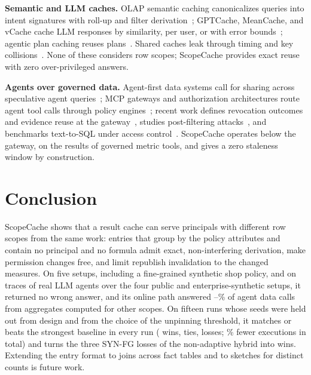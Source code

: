 \documentclass[sigconf, nonacm]{acmart}
\begin{document}
\textbf{Semantic and LLM caches.} OLAP semantic caching canonicalizes queries into intent signatures with roll-up and filter derivation~\cite{bindschaedler26}; GPTCache, MeanCache, and vCache cache LLM responses by similarity, per user, or with error bounds~\cite{gptcache23,meancache24,vcache25}; agentic plan caching reuses plans~\cite{plancache25}. Shared caches leak through timing and key collisions~\cite{gu25,song24,keycoll26}. None of these considers row scopes; ScopeCache provides exact reuse with zero over-privileged answers.

\textbf{Agents over governed data.} Agent-first data systems call for sharing across speculative agent queries~\cite{agentfirst25,wadlom26}; MCP gateways and authorization architectures route agent tool calls through policy engines~\cite{mcpgw26,authzarch26}; recent work defines revocation outcomes and evidence reuse at the gateway~\cite{revocation26,matoi26,notrace26}, studies post-filtering attacks~\cite{plaintext26}, and benchmarks text-to-SQL under access control~\cite{rbact2s26,rolerefusal25}. ScopeCache operates below the gateway, on the results of governed metric tools, and gives a zero staleness window by construction.

\section{Conclusion}
\label{sec:conclusion}

ScopeCache shows that a result cache can serve principals with different row scopes from the same work: entries that group by the policy attributes and contain no principal and no formula admit exact, non-interfering derivation, make permission changes free, and limit republish invalidation to the changed measures. On five setups, including a fine-grained synthetic shop policy, and on traces of real LLM agents over the four public and enterprise-synthetic setups, it returned no wrong answer, and its online path answered \agentXscopeMeanLo--\agentXscopeMeanHi\% of agent data calls from aggregates computed for other scopes. On fifteen runs whose seeds were held out from design and from the choice of the unpinning threshold, it matches or beats the strongest baseline in every run (\psvW{} wins, \psvT{} ties, \psvL{} losses; \freshRedTot\% fewer executions in total) and turns the three SYN-FG losses of the non-adaptive hybrid into wins. Extending the entry format to joins across fact tables and to sketches for distinct counts is future work.
\end{document}

